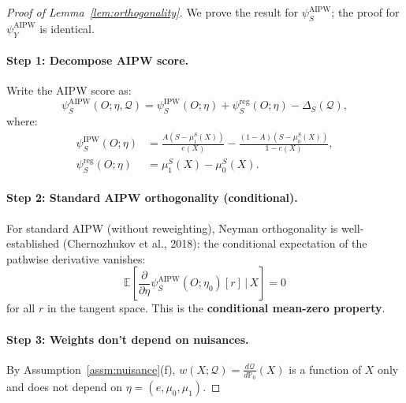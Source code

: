 \begin{proof}[Proof of Lemma~\ref{lem:orthogonality}]
We prove the result for $\psi_S^{\text{AIPW}}$; the proof for $\psi_Y^{\text{AIPW}}$ is identical.

\paragraph{Step 1: Decompose AIPW score.}
Write the AIPW score as:
\begin{equation}
\psi_S^{\text{AIPW}}(O; \eta, \mathcal{Q}) = \psi_S^{\text{IPW}}(O; \eta) + \psi_S^{\text{reg}}(O; \eta) - \Delta_S(\mathcal{Q}),
\end{equation}
where:
\begin{align}
\psi_S^{\text{IPW}}(O; \eta) &= \frac{A(S - \mu_1^S(X))}{e(X)} - \frac{(1-A)(S - \mu_0^S(X))}{1-e(X)}, \\
\psi_S^{\text{reg}}(O; \eta) &= \mu_1^S(X) - \mu_0^S(X).
\end{align}

\paragraph{Step 2: Standard AIPW orthogonality (conditional).}
For standard AIPW (without reweighting), Neyman orthogonality is well-established (Chernozhukov et al., 2018): the conditional expectation of the pathwise derivative vanishes:
\begin{equation}
\mathbb{E}\left[\frac{\partial}{\partial\eta}\psi_S^{\text{AIPW}}(O; \eta_0)[r] \,\bigg|\, X\right] = 0
\end{equation}
for all $r$ in the tangent space. This is the \textbf{conditional mean-zero property}.

\paragraph{Step 3: Weights don't depend on nuisances.}
By Assumption~\ref{assm:nuisance}(f), $w(X; \mathcal{Q}) = \frac{d\mathcal{Q}}{d\mathbb{P}_0}(X)$ is a function of $X$ only and does not depend on $\eta = (e, \mu_0, \mu_1)$.


\end{proof}
